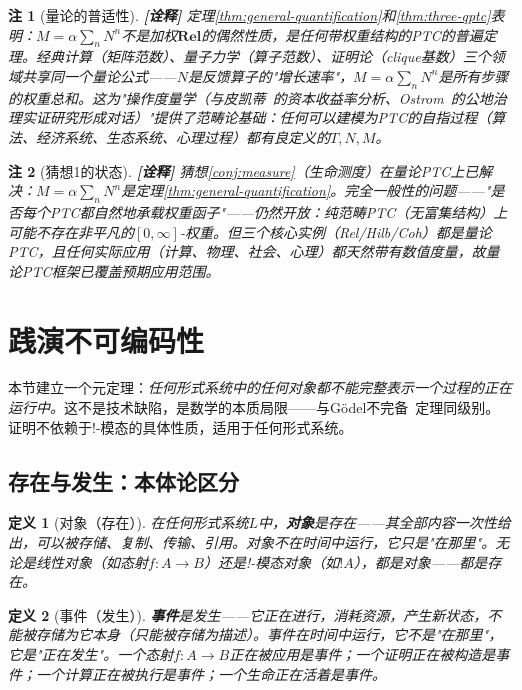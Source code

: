 \documentclass[11pt,a4paper]{article}
\newtheorem{definition}{定义}
\newtheorem{remark}{注}
\newcommand{\lvl}[1]{\hfill\textbf{\footnotesize[#1]}}
\newcommand{\lvI}{\lvl{诠释}}
\begin{document}
\begin{remark}[量论的普适性]\lvI
定理\ref{thm:general-quantification}和\ref{thm:three-qptc}表明：$M=\alpha\sum_n N^n$不是加权$\mathbf{Rel}$的偶然性质，是\emph{任何带权重结构的PTC}的普遍定理。经典计算（矩阵范数）、量子力学（算子范数）、证明论（clique基数）三个领域共享同一个量论公式——$N$是反馈算子的"增长速率"，$M=\alpha\sum_n N^n$是所有步骤的权重总和。这为"操作度量学（与皮凯蒂~\cite{piketty14}的资本收益率分析、Ostrom~\cite{ostrom90}的公地治理实证研究形成对话）"提供了范畴论基础：任何可以建模为PTC的自指过程（算法、经济系统、生态系统、心理过程）都有良定义的$T,N,M$。
\end{remark}

\begin{remark}[猜想1的状态]\lvI
猜想\ref{conj:measure}（生命测度）在\emph{量论PTC}上已解决：$M=\alpha\sum_n N^n$是定理\ref{thm:general-quantification}。完全一般性的问题——"是否每个PTC都自然地承载权重函子"——仍然开放：纯范畴PTC（无富集结构）上可能不存在非平凡的$[0,\infty]$-权重。但三个核心实例（Rel/Hilb/Coh）都是量论PTC，且任何实际应用（计算、物理、社会、心理）都天然带有数值度量，故量论PTC框架已覆盖预期应用范围。
\end{remark}

\section{践演不可编码性}

本节建立一个元定理：\emph{任何形式系统中的任何对象都不能完整表示一个过程的正在运行中。}这不是技术缺陷，是数学的本质局限——与G\"odel不完备~\cite{godel31}定理同级别。证明不依赖于!-模态的具体性质，适用于任何形式系统。

\subsection{存在与发生：本体论区分}

\begin{definition}[对象（存在）]\label{def:object-being}
在任何形式系统$L$中，\textbf{对象}是\emph{存在}——其全部内容一次性给出，可以被存储、复制、传输、引用。对象不在时间中运行，它只是"在那里"。无论是线性对象（如态射$f:A\to B$）还是!-模态对象（如$!A$），都是对象——都是存在。
\end{definition}

\begin{definition}[事件（发生）]\label{def:event-happening}
\textbf{事件}是\emph{发生}——它正在进行，消耗资源，产生新状态，不能被存储为它本身（只能被存储为描述）。事件在时间中运行，它不是"在那里"，它是"正在发生"。一个态射$f:A\to B$\emph{正在被应用}是事件；一个证明\emph{正在被构造}是事件；一个计算\emph{正在被执行}是事件；一个生命\emph{正在活着}是事件。
\end{definition}
\end{document}

